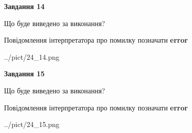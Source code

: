 \documentclass[11pt, ukrainian]{article}
\begin{document}
{\begin {large}
{\begin {center}\textbf{Завдання 14}\end {center}}\par
Що буде виведено за виконання? \par
Повідомлення інтерпретатора про помилку позначати \textbf{error}

\begin{center}
	{../pict/24_14.png}
\end{center}
\newpage

{\begin {center}\textbf{Завдання 15}\end {center}}\par
Що буде виведено за виконання? \par
Повідомлення інтерпретатора про помилку позначати \textbf{error}

\begin{center}
	{../pict/24_15.png}
\end{center}
\newpage

\end {large}}
\end{document}
